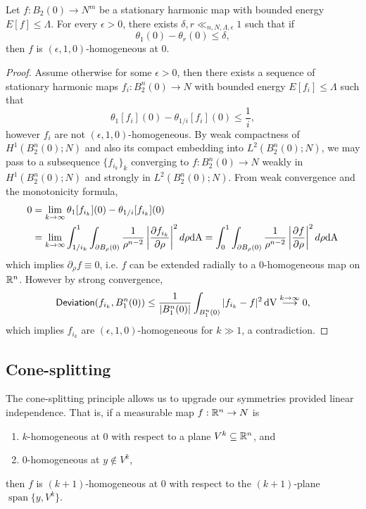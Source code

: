 \begin{lemma}
	Let $f: B_2 (0) \to N^m$ be a stationary harmonic map with bounded energy $E[f] \leq \Lambda$. For every $\epsilon > 0$, there exists $\delta, r \ll_{n, N, \Lambda, \epsilon} 1$ such that if
		\[ \theta_1 (0) - \theta_r (0) \leq \delta, \]
	then $f$ is $(\epsilon, 1, 0)$-homogeneous at $0$. 	\label{lem:rigid}
\end{lemma}

\begin{proof}
	Assume otherwise for some $\epsilon > 0$, then there exists a sequence of stationary harmonic maps $f_i : B_2^n (0) \to N$ with bounded energy $E[f_i] \leq \Lambda$ such that 
		\[ \theta_1 [f_i] (0) - \theta_{1/i} [f_i] (0) \leq \frac1i,\]
	however $f_i$ are not $(\epsilon, 1, 0)$-homogeneous. By weak compactness of $H^1 (B_2^n (0); N)$ and also its compact embedding into $L^2 (B_2^n (0); N)$, we may pass to a subsequence $\{ f_{i_k} \}_k$ converging to $f : B_2^n (0) \to N$ weakly in $H^1 (B_2^n (0); N)$ and strongly in $L^2 (B_2^n (0); N)$. From weak convergence and the monotonicity formula, 
		\begin{align*}
			 0 
			 	&= \lim_{k \to \infty} \theta_1 [f_{i_k}] (0) - \theta_{1/i} [f_{i_k}] (0) \\
			 	&= \lim_{k \to \infty} \int_{1/i_k}^1 \int_{\partial B_\rho (0)} \frac{1}{\rho^{n - 2}} \left| \frac{\partial f_{i_k}}{\partial \rho} \right|^2 d\rho \mathrm{dA} = \int_{0}^1 \int_{\partial B_\rho (0)} \frac{1}{\rho^{n - 2}} \left| \frac{\partial f}{\partial \rho} \right|^2 d\rho \mathrm{dA}
		\end{align*}	 
	which implies $\partial_\rho f \equiv 0$, i.e. $f$ can be extended radially to a $0$-homogeneous map on $\mathbb R^n$. However by strong convergence,
		\[ \mathsf{Deviation} (f_{i_k}, B^n_1 (0)) \leq  \frac{1}{|B_1^n (0)|} \int_{B_1 ^n(0) }  |f_{i_k} - f|^2 \, \mathrm{dV} \overset{k \to \infty}{\longrightarrow} 0, \]
	which implies $f_{i_k}$ are $(\epsilon, 1, 0)$-homogeneous for $k \gg 1$, a contradiction. 
\end{proof}

\subsection{Cone-splitting}


The cone-splitting principle allows us to upgrade our symmetries provided linear independence. That is, if a measurable map $f: \mathbb R^n \to N$ is 
	\begin{enumerate}
		\item $k$-homogeneous at $0$ with respect to a plane $V^k \subseteq \mathbb R^n$, and
		\item $0$-homogeneous at $y \not\in V^k$,
	\end{enumerate}
then $f$ is	$(k + 1)$-homogeneous at $0$ with respect to the $(k+ 1)$-plane $\operatorname{span} \{ y, V^k \}$.

